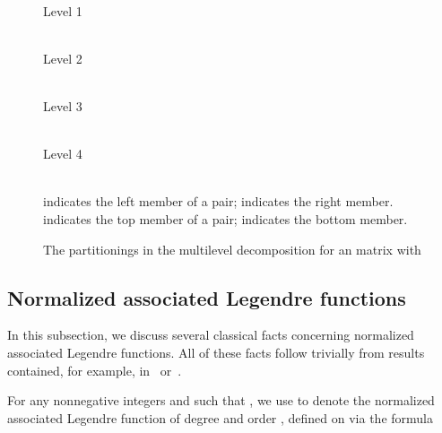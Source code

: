 \documentclass[final,3p,times]{elsarticle}
\begin{document}
\begin{figure}
\begin{center}
\caption{The partitionings in the multilevel decomposition
         for an  matrix with }
\label{multi}
\vspace{1.5em}
\begin{minipage}{1in}
\begin{center}
 \\
Level 1
\end{center}
\end{minipage}
\begin{minipage}{1in}
\begin{center}
 \\
Level 2
\end{center}
\end{minipage}
\begin{minipage}{1in}
\begin{center}
 \\
Level 3
\end{center}
\end{minipage}
\begin{minipage}{1in}
\begin{center}
 \\
Level 4
\end{center}
\end{minipage}
\\\vspace{1 em}
 indicates the left member of a pair;  indicates the right member. \\
 indicates the top member of a pair;  indicates the bottom member.
\end{center}
\end{figure}


\subsection{Normalized associated Legendre functions}
\label{basic}


In this subsection, we discuss several classical facts concerning
normalized associated Legendre functions.
All of these facts follow trivially from results contained,
for example, in~\cite{abramowitz-stegun} or~\cite{szego}.


For any nonnegative integers  and  such that ,
we use  to denote the normalized associated Legendre function
of degree  and order , defined on  via the formula
\end{document}
